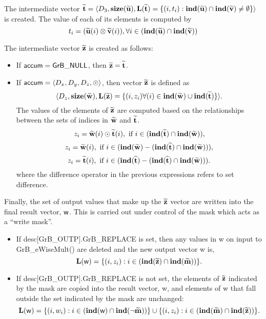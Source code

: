 The intermediate vector ${\bf \widetilde{t}} = \langle
D_3, \bold{size}({\bf \widetilde{u}}),
\bold{L}({\bf \widetilde{t}}) =
\{(i,t_i) : \bold{ind}({\bf \widetilde{u}}) \cap 
\bold{ind}({\bf \widetilde{v}})
 \neq \emptyset \} \rangle$
is created.  The value of each of its elements is computed by 
\[t_i = ({\bf \widetilde{u}}(i)
\otimes {\bf \widetilde{v}}(i)), \forall i \in 
(\bold{ind}({\bf \widetilde{u}}) \cap 
\bold{ind}({\bf \widetilde{v}}))\]

The intermediate vector ${\bf \widetilde{z}}$ is created as follows:
\begin{itemize}
    \item If ${\sf accum} = {\sf GrB\_NULL}$, then ${\bf \widetilde{z}} = {\bf \widetilde{t}}$.

    \item If ${\sf accum} = \langle D_x, D_y, D_z, \odot \rangle$, then vector ${\bf \widetilde{z}}$ is defined as 
        \[ \langle D_z, \bold{size}({\bf \widetilde{w}}), \bold{L}({\bf \widetilde{z}})
		= \{(i,z_{i})  \forall (i) \in \bold{ind}({\bf \widetilde{w}}) \cup 
        \bold{ind}({\bf \widetilde{t}}) \} \rangle.\]
    The values of the elements of ${\bf \widetilde{z}}$ are computed based on the 
    relationships between the sets of indices in ${\bf \widetilde{w}}$ and 
    ${\bf \widetilde{t}}$.
\[
z_{i} = {\bf \widetilde{w}}(i) \odot {\bf \widetilde{t}}(i), \ \mbox{if}\  i \in  (\bold{ind}({\bf \widetilde{t}}) \cap \bold{ind}({\bf \widetilde{w}})),
\]
\[
z_{i} = \vector{\widetilde{w}}(i), \ \mbox{if}\  i \in  (\bold{ind}(\vector{\widetilde{w}}) - (\bold{ind}(\vector{\widetilde{t}}) \cap \bold{ind}(\vector{\widetilde{w}}))),
\]
\[
z_{i} = \vector{\widetilde{t}}(i), \ \mbox{if}\  i \in  (\bold{ind}(\vector{\widetilde{t}}) - (\bold{ind}(\vector{\widetilde{t}}) \cap \bold{ind}(\vector{\widetilde{w}}))).
\]
where the difference operator in the previous expressions refers to set difference.
\end{itemize}

Finally, the set of output values that make up the ${\bf \widetilde{z}}$ 
vector are written into the final result vector, ${\sf w}$. 
This is carried out under control of the mask which acts as a ``write mask''.
\begin{itemize}
\item If {\sf desc[GrB\_OUTP].GrB\_REPLACE} is set, then any values in {\sf w} 
on input to {\sf GrB\_eWiseMult()} are deleted and the new output vector {\sf w} is,
\[ \bold{L}({\sf w}) = \{(i,z_{i}) : i \in (\bold{ind}({\bf \widetilde{z}}) 
\cap \bold{ind}({\bf \widetilde{m}})) \}. \]

\item If {\sf desc[GrB\_OUTP].GrB\_REPLACE} is not set, the elements of 
${\bf \widetilde{z}}$ indicated by 
the mask are copied into the result vector, {\sf w}, and elements of 
{\sf w} that fall outside the set indicated by the mask are unchanged:
\[ \bold{L}({\sf w}) = \{(i,w_{i}) : i \in (\bold{ind}({\sf w}) 
\cap \bold{ind}(\neg {\bf \widetilde{m}})) \} \cup \{(i,z_{i}) : i \in 
(\bold{ind}({\bf \widetilde{m}}) \cap \bold{ind}({\bf \widetilde{z}})) \}. \]
\end{itemize}

